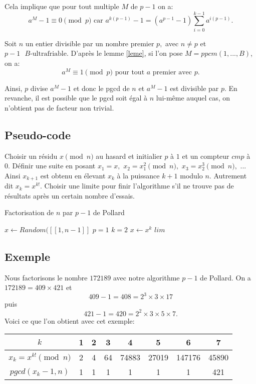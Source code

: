\documentclass[french, 12pt, titlepage]{article}
\begin{document}
Cela implique que pour tout multiple $M$ de $p-1$ on a: \[ a^M - 1 \equiv 0 \pmod p \text{ car } a^{k(p-1)} - 1 = (a^{p-1} - 1 )\sum\limits_{i=0}^{k-1} a^{i(p-1)} . \]

Soit $n$ un entier divisible par un nombre premier $p,$ avec $n \neq p$
et $p-1 \text{ } B\text{-ultrafriable}.$
D'après le lemme \ref{leme}, si l'on pose $M = ppcm(1, ..., B)$, on a: \[ a^M \equiv 1 \pmod p \text{ pour tout } a \text{ premier avec } p . \]

Ainsi, $p$ divise $a^M - 1$ et donc le pgcd de $n$ et $a^M - 1$ est
divisible par $p.$
En revanche, il est possible que le pgcd soit égal à $n$ lui-même auquel cas, on n'obtient pas de facteur non trivial.

\subsection{Pseudo-code}

Choisir un résidu $x \pmod n$ au hasard et initialier $p$ à $1$ et un compteur $cmp$ à $0.$
Définir une suite en posant $x_1 = x,$ $x_2 = x_1^2 \pmod n,$ $x_3 = x_2^3 \pmod n,$ ... Ainsi $x_ {k+1}$ est obtenu en élevant $x_k$ à la puissance $k+1$ modulo $n.$ Autrement dit $x_k = x^{k!}.$
Choisir une limite pour finir l'algorithme s'il ne trouve pas de résultats après un certain nombre d'essais.

\begin{algorithm}
\caption{Factorisation de $n$ par $p-1$ de Pollard}
\BlankLine
$x \gets Random([\![1,n-1]\!]$\;
$p = 1$\;
$k = 2$\;
$x \gets x^k$\;
$lim$\;
\end{algorithm}

\subsection{Exemple}

Nous factorisons le nombre $172189$ avec notre algorithme $p-1$ de Pollard.
On a $172189 = 409 \times 421$ et \[409 - 1 = 408 = 2^3 \times 3 \times 17 \] puis \[421-1 = 420 = 2^2 \times 3 \times 5 \times 7.\] 
Voici ce que l'on obtient avec cet exemple:

\begin{center}
\begin{tabular}{|c||c|c|c|c|c|c|c|}
\hline
$k$ & 1 & 2 & 3 & 4 & 5 & 6 & 7 \\
\hline
$x_k = x^{k!} \pmod n$ & 2 & 4 & 64 & 74883 & 27019 & 147176 & 45890 \\
\hline
$pgcd(x_k -1, n)$ & 1 & 1 & 1 & 1 & 1 & 1 & 421\\
\hline
\end{tabular}
\end{center}
\end{document}
